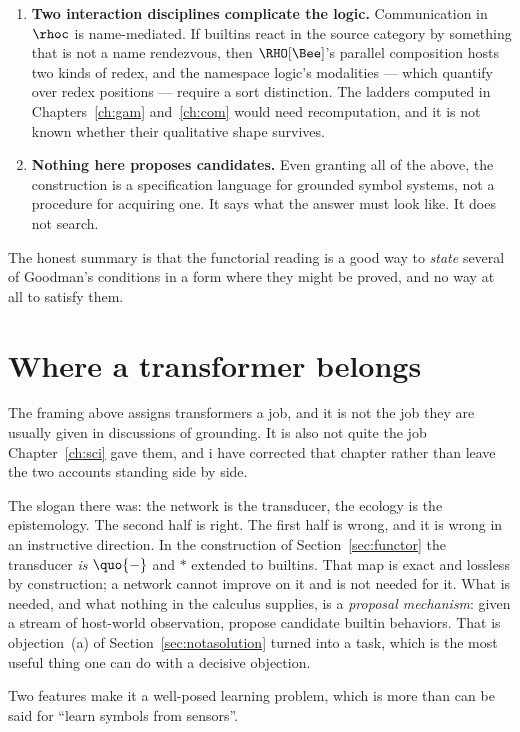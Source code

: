 \begin{enumerate}[label=\textbf{(\alph*)},leftmargin=2.4em]
\item \textbf{Two interaction disciplines complicate the logic.}
Communication in $\rhoc$ is name-mediated.
If builtins react in the source category by something that is not a
name rendezvous, then $\RHO[\Bee]$'s parallel composition hosts two
kinds of redex, and the namespace logic's modalities --- which
quantify over redex positions --- require a sort distinction.
The ladders computed in Chapters~\ref{ch:gam} and~\ref{ch:com}
would need recomputation, and it is not known whether their
qualitative shape survives.

\item \textbf{Nothing here proposes candidates.}
Even granting all of the above, the construction is a specification
language for grounded symbol systems, not a procedure for acquiring
one.
It says what the answer must look like.
It does not search.

\end{enumerate}

\noindent
The honest summary is that the functorial reading is a good way to
\emph{state} several of Goodman's conditions in a form where they
might be proved, and no way at all to satisfy them.

\section{Where a transformer belongs}
\label{sec:transformer}

The framing above assigns transformers a job, and it is not the job
they are usually given in discussions of grounding.
It is also not quite the job Chapter~\ref{ch:sci} gave them, and
i have corrected that chapter rather than leave the two accounts
standing side by side.

The slogan there was: the network is the transducer, the ecology is
the epistemology.
The second half is right.
The first half is wrong, and it is wrong in an instructive
direction.
In the construction of Section~\ref{sec:functor} the transducer
\emph{is} $\quo{-}$ and $*$ extended to builtins.
That map is exact and lossless by construction; a network cannot
improve on it and is not needed for it.
What is needed, and what nothing in the calculus supplies, is a
\emph{proposal mechanism}: given a stream of host-world
observation, propose candidate builtin behaviors.
That is objection~(a) of Section~\ref{sec:notasolution} turned into
a task, which is the most useful thing one can do with a decisive
objection.

Two features make it a well-posed learning problem, which is more
than can be said for ``learn symbols from sensors''.

